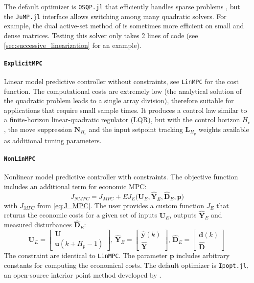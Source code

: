 The default optimizer is \texttt{OSQP.jl} that efficiently handles sparse problems \citep{osqp}, but the \texttt{JuMP.jl} interface allows switching among many quadratic solvers. For example, the dual active-set method of \citet{daqp} is sometimes more efficient on small and dense matrices. Testing this solver only takes 2 lines of code (see \cref{sec:successive_linearization} for an example).

\paragraph{\texttt{ExplicitMPC}}
Linear model predictive controller without constraints, see \texttt{LinMPC} for the cost function. The computational costs are extremely low (the analytical solution of the quadratic problem leads to a single array division), therefore suitable for applications that require small sample times. It produces a control law similar to a finite-horizon linear-quadratic regulator (LQR), but with the control horizon $H_c$, the move suppression $\mathbf{N}_{H_c}$ and the input setpoint tracking $\mathbf{L}_{H_p}$ weights available as additional tuning parameters.

\paragraph{\texttt{NonLinMPC}}
Nonlinear model predictive controller with constraints. The objective function includes an additional term for economic MPC:
\begin{equation}\label{eq:J_NMPC}
J_{\mathit{NMPC}} = J_{\mathit{MPC}} 
    + E J_E\big(\mathbf{U}_E, \mathbf{\hat{Y}}_E, \mathbf{\hat{D}}_E, \mathbf{p}\big)
\end{equation}
with $J_{\mathit{MPC}}$ from \eqref{eq:J_MPC}. The user provides a custom function $J_E$ that returns the economic costs for a given set of inputs $\mathbf{U}_E$, outputs $\mathbf{\hat{Y}}_E$ and measured disturbances $\mathbf{\hat{D}}_E$:
\begin{equation}
\mathbf{U}_E = 
\begin{bmatrix}
    \mathbf{U} \\ \mathbf{u}(k+H_p-1)
\end{bmatrix}\!,\,
\mathbf{\hat{Y}}_E = 
\begin{bmatrix}
    \mathbf{\hat{y}}(k) \\ \mathbf{\hat{Y}}
\end{bmatrix}\!,\, 
\mathbf{\hat{D}}_E = 
\begin{bmatrix}
    \mathbf{d}(k) \\ \mathbf{\hat{D}}
\end{bmatrix} 
\end{equation} 
The constraint are identical to \texttt{LinMPC}. The parameter $\mathbf{p}$ includes arbitrary constants for computing the economical costs. The default optimizer is \texttt{Ipopt.jl}, an open-source interior point method developed by \citet{ipopt}.
